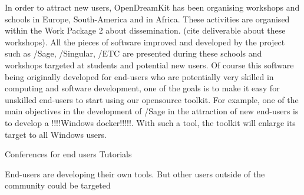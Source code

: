 \documentclass{deliverablereport}
\begin{document}
In order to attract new users, OpenDreamKit has been organising workshops and schools in Europe, South-America and in Africa. These activities are organised within the Work Package 2 about dissemination. (cite deliverable about these workshops). All the pieces of software improved and developed by the project such as /Sage, /Singular, /ETC are presented during these schools and workshops targeted at students and potential new users. Of course this software being originally developed for end-users who are potentially very skilled in computing and software development, one of the goals is to make it easy  for unskilled end-users to start using our opensource toolkit. 
For example, one of the main objectives in the development of /Sage in the attraction of new end-users is to develop a !!!!Windows docker!!!!!. With such a tool, the toolkit will enlarge its target to all Windows users. 

Conferences for end users
Tutorials


End-users are developing their own tools. But other users outside of the community could be targeted
\printbibliography
\end{document}
